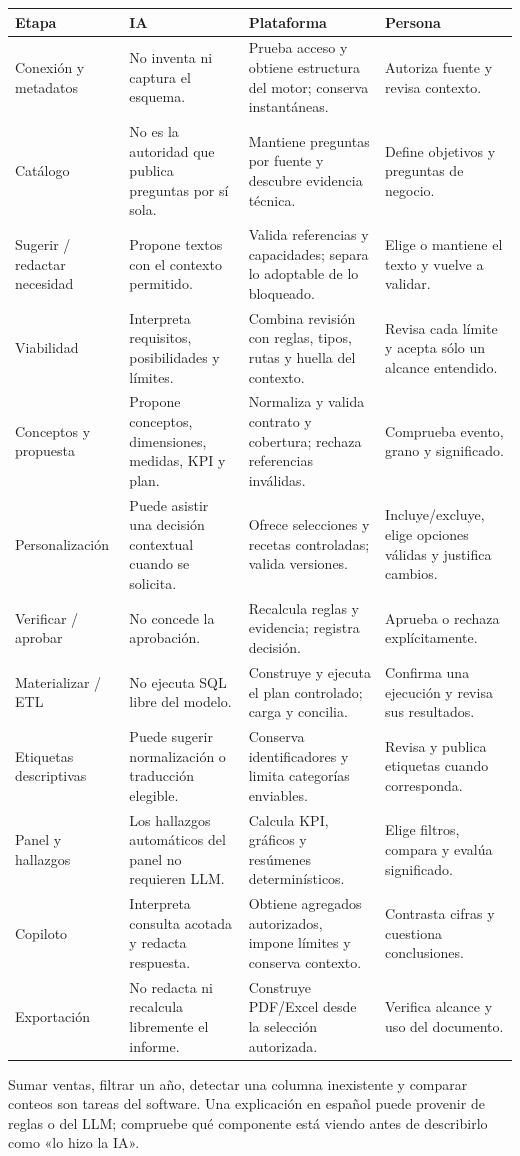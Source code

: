 {\small
\begin{tabularx}{\linewidth}{@{}p{24mm}YYY@{}}
\toprule
\textbf{Etapa}&\textbf{IA}&\textbf{Plataforma}&\textbf{Persona}\\
\midrule
Conexión y metadatos&No inventa ni captura el esquema.&Prueba acceso y obtiene estructura del motor; conserva instantáneas.&Autoriza fuente y revisa contexto.\\
Catálogo&No es la autoridad que publica preguntas por sí sola.&Mantiene preguntas por fuente y descubre evidencia técnica.&Define objetivos y preguntas de negocio.\\
Sugerir / redactar necesidad&Propone textos con el contexto permitido.&Valida referencias y capacidades; separa lo adoptable de lo bloqueado.&Elige o mantiene el texto y vuelve a validar.\\
Viabilidad&Interpreta requisitos, posibilidades y límites.&Combina revisión con reglas, tipos, rutas y huella del contexto.&Revisa cada límite y acepta sólo un alcance entendido.\\
Conceptos y propuesta&Propone conceptos, dimensiones, medidas, KPI y plan.&Normaliza y valida contrato y cobertura; rechaza referencias inválidas.&Comprueba evento, grano y significado.\\
Personalización&Puede asistir una decisión contextual cuando se solicita.&Ofrece selecciones y recetas controladas; valida versiones.&Incluye/excluye, elige opciones válidas y justifica cambios.\\
Verificar / aprobar&No concede la aprobación.&Recalcula reglas y evidencia; registra decisión.&Aprueba o rechaza explícitamente.\\
Materializar / ETL&No ejecuta SQL libre del modelo.&Construye y ejecuta el plan controlado; carga y concilia.&Confirma una ejecución y revisa sus resultados.\\
Etiquetas descriptivas&Puede sugerir normalización o traducción elegible.&Conserva identificadores y limita categorías enviables.&Revisa y publica etiquetas cuando corresponda.\\
Panel y hallazgos&Los hallazgos automáticos del panel no requieren LLM.&Calcula KPI, gráficos y resúmenes determinísticos.&Elige filtros, compara y evalúa significado.\\
Copiloto&Interpreta consulta acotada y redacta respuesta.&Obtiene agregados autorizados, impone límites y conserva contexto.&Contrasta cifras y cuestiona conclusiones.\\
Exportación&No redacta ni recalcula libremente el informe.&Construye PDF/Excel desde la selección autorizada.&Verifica alcance y uso del documento.\\
\bottomrule
\end{tabularx}}
\begin{note}
Sumar ventas, filtrar un año, detectar una columna inexistente y comparar conteos son tareas del software. Una explicación en español puede provenir de reglas o del LLM; compruebe qué componente está viendo antes de describirlo como «lo hizo la IA».
\end{note}


